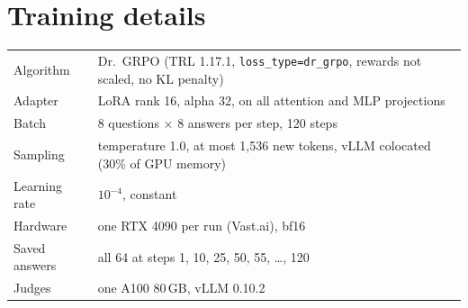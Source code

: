\documentclass[10pt]{article}
\begin{document}
\section{Training details}
\label{app:training}
\begin{table}[H]
\centering\small
\begin{tabular}{l l}
\toprule
Algorithm & Dr.\ GRPO (TRL 1.17.1, \texttt{loss\_type=dr\_grpo}, rewards not scaled, no KL penalty) \\
Adapter & LoRA rank 16, alpha 32, on all attention and MLP projections \\
Batch & 8 questions $\times$ 8 answers per step, 120 steps \\
Sampling & temperature 1.0, at most 1,536 new tokens, vLLM colocated (30\% of GPU memory) \\
Learning rate & $10^{-4}$, constant \\
Hardware & one RTX 4090 per run (Vast.ai), bf16 \\
Saved answers & all 64 at steps 1, 10, 25, 50, 55, \ldots, 120 \\
Judges & one A100 80\,GB, vLLM 0.10.2 \\
\bottomrule
\end{tabular}
\end{table}
\end{document}
